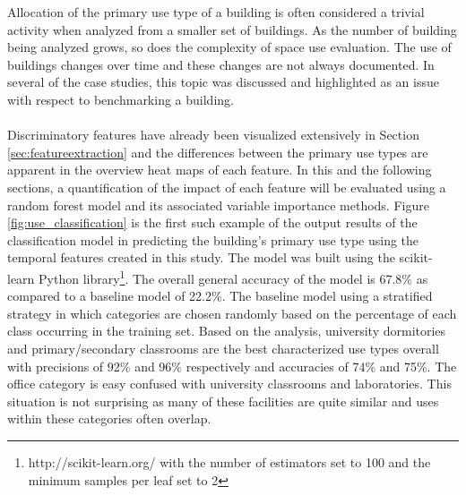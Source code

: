Allocation of the primary use type of a building is often considered a trivial activity when analyzed from a smaller set of buildings. As the number of building being analyzed grows, so does the complexity of space use evaluation. The use of buildings changes over time and these changes are not always documented. In several of the case studies, this topic was discussed and highlighted as an issue with respect to benchmarking a building.\\
\\
Discriminatory features have already been visualized extensively in Section \ref{sec:featureextraction} and the differences between the primary use types are apparent in the overview heat maps of each feature. In this and the following sections, a quantification of the impact of each feature will be evaluated using a random forest model and its associated variable importance methods. Figure \ref{fig:use_classification} is the first such example of the output results of the classification model in predicting the building's primary use type using the temporal features created in this study. The model was built using the scikit-learn Python library\footnote{http://scikit-learn.org/ with the number of estimators set to 100 and the minimum samples per leaf set to 2}. The overall general accuracy of the model is 67.8\% as compared to a baseline model of 22.2\%. The baseline model using a stratified strategy in which categories are chosen randomly based on the percentage of each class occurring in the training set. Based on the analysis, university dormitories and primary/secondary classrooms are the best characterized use types overall with precisions of 92\% and 96\% respectively and accuracies of 74\% and 75\%. The office category is easy confused with university classrooms and laboratories. This situation is not surprising as many of these facilities are quite similar and uses within these categories often overlap. 